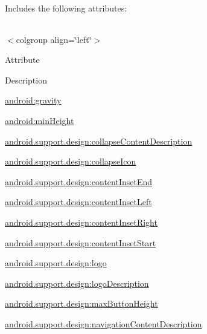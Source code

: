 Includes the following attributes\+:

\tabulinesep=1mm
\begin{longtabu} spread 0pt [c]{*{0}{|X[-1]}|}
\hline
\end{longtabu}
$<$colgroup align=\char`\"{}left\char`\"{}$>$ 

Attribute

Description 

{\ttfamily \hyperlink{classandroid_1_1support_1_1design_1_1R_1_1styleable_a284a71ada839c36b151c703e6669cb1f}{android\+:gravity}}

{\ttfamily \hyperlink{classandroid_1_1support_1_1design_1_1R_1_1styleable_a896491cbc15c41005ac0372a7652eb54}{android\+:min\+Height}}

{\ttfamily \hyperlink{classandroid_1_1support_1_1design_1_1R_1_1styleable_a89d74d3552a12cf237615786e552301a}{android.\+support.\+design\+:collapse\+Content\+Description}}

{\ttfamily \hyperlink{classandroid_1_1support_1_1design_1_1R_1_1styleable_ab8736925c114eaeba368273e6f851ae8}{android.\+support.\+design\+:collapse\+Icon}}

{\ttfamily \hyperlink{classandroid_1_1support_1_1design_1_1R_1_1styleable_a0ed60bf0f8960c63916d30821f0bca48}{android.\+support.\+design\+:content\+Inset\+End}}

{\ttfamily \hyperlink{classandroid_1_1support_1_1design_1_1R_1_1styleable_a16a950fb278dbd84e59f4e5475d33578}{android.\+support.\+design\+:content\+Inset\+Left}}

{\ttfamily \hyperlink{classandroid_1_1support_1_1design_1_1R_1_1styleable_afa26b6ecdf630ac0c5f79af2ca0a1f2a}{android.\+support.\+design\+:content\+Inset\+Right}}

{\ttfamily \hyperlink{classandroid_1_1support_1_1design_1_1R_1_1styleable_a6205b5236737b47332a0c7ab6459eb3d}{android.\+support.\+design\+:content\+Inset\+Start}}

{\ttfamily \hyperlink{classandroid_1_1support_1_1design_1_1R_1_1styleable_ad96363fdb81c5fc57ecb7ca211213675}{android.\+support.\+design\+:logo}}

{\ttfamily \hyperlink{classandroid_1_1support_1_1design_1_1R_1_1styleable_adad105d3b3d5e31681bf954d0a474308}{android.\+support.\+design\+:logo\+Description}}

{\ttfamily \hyperlink{classandroid_1_1support_1_1design_1_1R_1_1styleable_a23d4ceb83bb1200d96e248f73e941f3e}{android.\+support.\+design\+:max\+Button\+Height}}

{\ttfamily \hyperlink{classandroid_1_1support_1_1design_1_1R_1_1styleable_af072d08cd3f8b67300f7852fec72150c}{android.\+support.\+design\+:navigation\+Content\+Description}}

